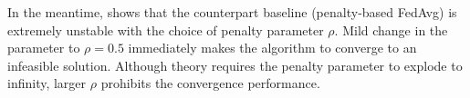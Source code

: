 \documentclass{article} %
\begin{document}
In the meantime,  shows that the counterpart baseline (penalty-based FedAvg) is extremely unstable with the choice of penalty parameter $\rho$. Mild change in the parameter to $\rho=0.5$ immediately makes the algorithm to converge to an infeasible solution. Although theory requires the penalty parameter to explode to infinity, larger $\rho$ prohibits the convergence performance.



\end{document}
